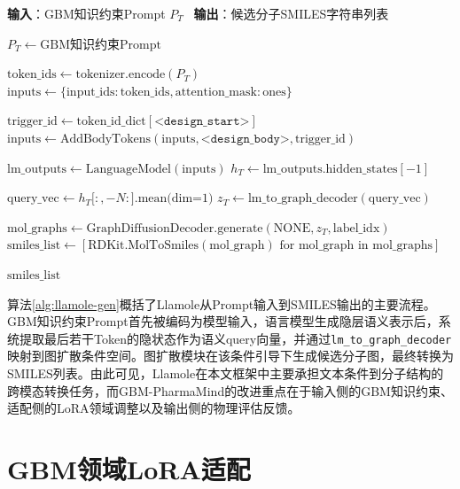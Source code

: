 \begin{algorithm}
\caption{Llamole跨模态分子生成算法}
\label{alg:llamole-gen}
\textbf{输入}：GBM知识约束Prompt $P_T$ \
\textbf{输出}：候选分子SMILES字符串列表

\begin{algorithmic}[1]
\State $P_T \leftarrow \text{GBM知识约束Prompt}$    

\State $\text{token\_ids} \leftarrow \text{tokenizer.encode}(P_T)$
\State $\text{inputs} \leftarrow \{\text{input\_ids}: \text{token\_ids}, \text{attention\_mask}: \text{ones}\}$

\State $\text{trigger\_id} \leftarrow \text{token\_id\_dict}[\texttt{<design\_start>}]$
\State $\text{inputs} \leftarrow \text{AddBodyTokens}(\text{inputs}, \texttt{<design\_body>}, \text{trigger\_id})$

\State $\text{lm\_outputs} \leftarrow \text{LanguageModel}(\text{inputs})$
\State $h_T \leftarrow \text{lm\_outputs.hidden\_states}[-1]$    

\State $\text{query\_vec} \leftarrow h_T[:, -N:\text{].mean(dim=1)}$    
\State $z_T \leftarrow \text{lm\_to\_graph\_decoder}(\text{query\_vec})$    \Comment{经线性投影层映射到图扩散条件空间}

\State $\text{mol\_graphs} \leftarrow \text{GraphDiffusionDecoder.generate}(\text{NONE}, z_T, \text{label\_idx})$    
\State $\text{smiles\_list} \leftarrow [\text{RDKit.MolToSmiles}(\text{mol\_graph}) \text{ for } \text{mol\_graph} \text{ in } \text{mol\_graphs}]$    

\State \Return $\text{smiles\_list}$
\end{algorithmic}
\end{algorithm}

算法\ref{alg:llamole-gen}概括了Llamole从Prompt输入到SMILES输出的主要流程。GBM知识约束Prompt首先被编码为模型输入，语言模型生成隐层语义表示后，系统提取最后若干Token的隐状态作为语义query向量，并通过\texttt{lm\_to\_graph\_decoder}映射到图扩散条件空间。图扩散模块在该条件引导下生成候选分子图，最终转换为SMILES列表。由此可见，Llamole在本文框架中主要承担文本条件到分子结构的跨模态转换任务，而GBM-PharmaMind的改进重点在于输入侧的GBM知识约束、适配侧的LoRA领域调整以及输出侧的物理评估反馈。

\section{GBM领域LoRA适配}\label{sec:lora-finetune}

